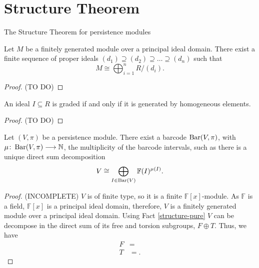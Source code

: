 \begin{definition}
     
\end{definition}

\begin{definition} \label{delta-matching}
    
\end{definition}

\begin{definition}
    
\end{definition}

\newpage
\section{Structure Theorem}
The Structure Theorem for persistence modules 

\begin{theorem} \label{structure-pure}
    Let $ M $ be a  finitely generated module over a principal ideal domain. There exist a finite sequence of proper ideals $ (d_1) \supseteq (d_2) \supseteq \dots \supseteq (d_n) $ such that
    $$
        M \cong \bigoplus_{i=1}^n R / (d_i).
    $$
\end{theorem}
\begin{proof}
    (TO DO)
\end{proof}

\begin{proposition} \cite[Proposition 4.6]{wang}
    An ideal $ I \subseteq R $ is graded if and only if it is generated by homogeneous elements.
\end{proposition}
\begin{proof}
    (TO DO)
\end{proof}

\begin{theorem}[Structure] \cite[Proposition 4.8]{wang} \label{structure}
    Let $ (V, \pi) $ be a persistence module. There exist a barcode $ \operatorname{Bar}(V, \pi) $, with $ \mu \colon \operatorname{Bar} (V, \pi) \longrightarrow \mathbb N $, the multiplicity of the barcode intervals, such as there is a unique direct sum decomposition
    $$
        V \cong \bigoplus_{I \in  \operatorname{Bar} (V)} \mathbb F (I)^{\mu (I)}.
    $$
\end{theorem}
\begin{proof}
    (INCOMPLETE)
    $ V $ is of finite type, so it is a finite $ \mathbb F[x] $-module. As $ \mathbb F $ is a field, $ \mathbb F[x] $ is a principal ideal domain, therefore, $ V $ is a finitely generated module over a principal ideal domain. Using Fact \ref{structure-pure} $ V $ can be decompose in the direct sum of its free and torsion subgroups, $ F \oplus T $. Thus, we have
    \begin{align*}
        F &= \\
        T &= .
    \end{align*}
    
\end{proof}

